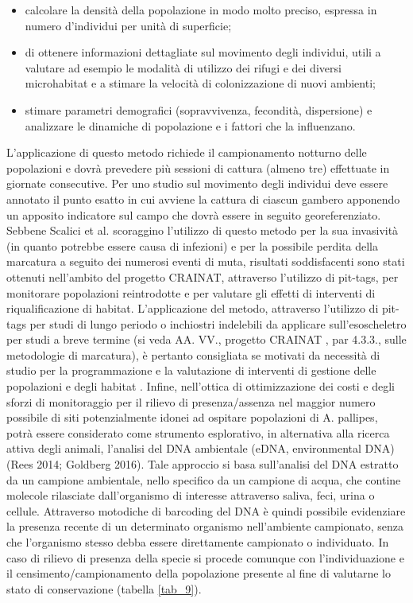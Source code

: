 \documentclass[11pt,a4paper,italian,twoside,openany]{memoir}
\newcommand{\etal}{et al. }
\begin{document}
\begin{itemize}
  \item calcolare la densità della popolazione in modo molto preciso, espressa in numero d'individui per unità di superficie;
  \item di ottenere informazioni dettagliate sul movimento degli individui, utili a valutare ad esempio le modalità di utilizzo dei rifugi e dei diversi microhabitat e a stimare la velocità di colonizzazione di nuovi ambienti;
  \item stimare parametri demografici (sopravvivenza, fecondità, dispersione) e analizzare le dinamiche di popolazione e i fattori che la influenzano.
\end{itemize}

L'applicazione di questo metodo richiede il campionamento notturno delle popolazioni e dovrà prevedere più sessioni di cattura (almeno tre) effettuate in giornate consecutive. Per uno studio sul movimento degli individui deve essere annotato il punto esatto in cui avviene la cattura di ciascun gambero apponendo un apposito indicatore sul campo che dovrà essere in seguito georeferenziato. Sebbene Scalici \etal \cite{Scalici 2016} scoraggino l'utilizzo di questo metodo per la sua invasività (in quanto potrebbe essere causa di infezioni) e per la possibile perdita della marcatura a seguito dei numerosi eventi di muta, risultati soddisfacenti sono stati ottenuti nell'ambito del progetto CRAINAT, attraverso l'utilizzo di pit-tags, per monitorare popolazioni reintrodotte e per valutare gli effetti di interventi di riqualificazione di habitat. L'applicazione del metodo, attraverso l'utilizzo di pit-tags per studi di lungo periodo o inchiostri indelebili da applicare sull'esoscheletro per studi a breve termine (si veda AA. VV., progetto CRAINAT \cite{AA. VV. 2014}, par 4.3.3., sulle metodologie di marcatura), è pertanto consigliata se motivati da necessità di studio per la programmazione e la valutazione di interventi di gestione delle popolazioni e degli habitat
.
Infine, nell'ottica di ottimizzazione dei costi e degli sforzi di monitoraggio per il rilievo di presenza/assenza nel maggior numero possibile di siti potenzialmente idonei ad ospitare popolazioni di A. pallipes, potrà essere considerato come strumento esplorativo, in alternativa alla ricerca attiva degli animali, l'analisi del DNA ambientale (eDNA, environmental DNA) (Rees 2014; Goldberg 2016). Tale approccio si basa sull'analisi del DNA estratto da un campione ambientale, nello specifico da un campione di acqua, che contine molecole rilasciate dall'organismo di interesse attraverso saliva, feci, urina o cellule. Attraverso motodiche di barcoding del DNA è quindi possibile evidenziare la presenza recente di un determinato organismo nell'ambiente campionato, senza che l'organismo stesso debba essere direttamente campionato o individuato. In caso di rilievo di presenza della specie si procede comunque con l'individuazione e il censimento/campionamento della popolazione presente al fine di valutarne lo stato di conservazione (tabella \ref{tab_9}). 
\end{document}
